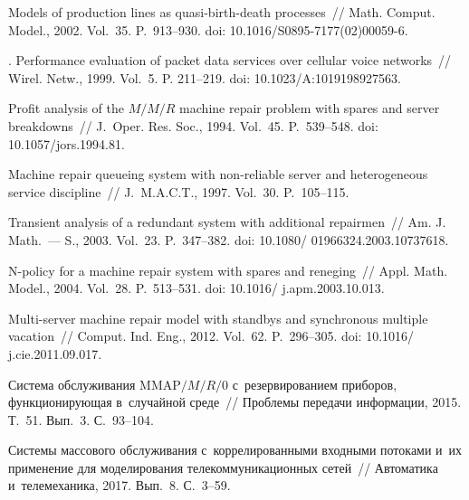 \begin{multicols}{2}
{{\begin{thebibliography}{99}
 Models of production lines 
as quasi-birth-death processes~// Math. Comput. Model., 2002. Vol.~35. P.~913--930.
doi: 10.1016/S0895-7177(02)00059-6.

. Performance evaluation of packet data 
services over cellular voice networks~// Wirel. Netw., 1999. Vol.~5. P. 211--219. doi: 10.1023/A:1019198927563.


 Profit analysis of the $M/M/R$ machine repair 
problem with spares and server breakdowns~// J.~Oper. Res. Soc., 1994. Vol.~45.  P.~539--548.
doi: 10.1057/jors.1994.81.



 Machine repair queueing system 
with non-reliable server and heterogeneous service discipline~// J.~M.A.C.T., 1997. Vol.~30. P.~105--115.

 Transient analysis of a redundant 
system with additional repairmen~// Am. J. Math.~--- S., 2003. Vol.~23. 
P.~347--382. doi: 10.1080/ 01966324.2003.10737618.

 N-policy for a machine repair 
system with spares and reneging~// Appl. Math. Model., 2004. Vol.~28. P.~513--531.
doi: 10.1016/ j.apm.2003.10.013.

 Multi-server machine repair model 
with standbys and synchronous multiple vacation~// Comput. Ind. Eng., 2012. Vol.~62. P.~296--305.
doi: 10.1016/ j.cie.2011.09.017.

 Сис\-те\-ма обслуживания $\mathrm{MMAP}/M/R/0$ 
с~резервированием приборов, функционирующая в~случайной среде~// Проблемы передачи 
информации, 2015. Т.~51. Вып.~3. С.~93--104.



 Сис\-те\-мы массового 
обслуживания с~коррелированными входными потоками и~их применение для 
моделирования телекоммуникационных сетей~// Автоматика и~телемеханика, 2017. Вып.~8. С.~3--59.


\end{thebibliography}}}
\end{multicols}
